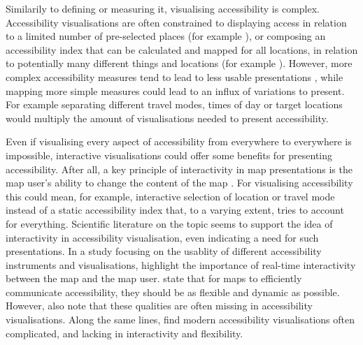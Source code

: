 Similarily to defining or measuring it, visualising accessibility is complex.
Accessibility visualisations are often constrained to displaying access in relation to
a limited number of pre-selected places (for example \textcite{wei2018}),
or composing an accessibility index that can be calculated and mapped for all locations,
in relation to potentially many different things and locations (for example \textcite{kim2019}).
However, more complex accessibility measures tend to lead to
less usable presentations \parencite{te2014},
while mapping more simple measures could lead to an influx of variations to present.
For example separating different travel modes, times of day or target locations
would multiply the amount of visualisations needed to present accessibility.


Even if visualising every aspect of accessibility
from everywhere to everywhere is impossible,
interactive visualisations could offer some benefits for presenting accessibility.
After all, a key principle of interactivity in map presentations is
the map user's ability to change the content of the map \parencite{rot2013b}.
For visualising accessibility this could mean, for example,
interactive selection of location or travel mode instead of
a static accessibility index that, to a varying extent,
tries to account for everything.
Scientific literature on the topic seems to support the idea of
interactivity in accessibility visualisation,
even indicating a need for such presentations.
In a study focusing on the usablity of
different accessibility instruments and visualisations,  %
\textcite{te2014} highlight the importance of
real-time interactivity between the map and the map user.
\textcite{but2018} state that for maps to efficiently communicate accessibility,
they should be as flexible and dynamic as possible.
However, \textcite{but2018} also note that
these qualities are often missing in accessibility visualisations.
Along the same lines, \textcite{paj2021} find modern accessibility visualisations often complicated,
and lacking in interactivity and flexibility.

